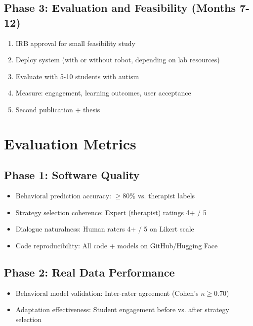 \documentclass[12pt, a4paper]{article}
\begin{document}
\subsection{Phase 3: Evaluation and Feasibility (Months 7-12)}

\begin{enumerate}
    \item IRB approval for small feasibility study
    \item Deploy system (with or without robot, depending on lab resources)
    \item Evaluate with 5-10 students with autism
    \item Measure: engagement, learning outcomes, user acceptance
    \item Second publication + thesis
\end{enumerate}

\section{Evaluation Metrics}

\subsection{Phase 1: Software Quality}

\begin{itemize}
    \item Behavioral prediction accuracy: $\geq 80\%$ vs. therapist labels
    \item Strategy selection coherence: Expert (therapist) ratings 4+ / 5
    \item Dialogue naturalness: Human raters 4+ / 5 on Likert scale
    \item Code reproducibility: All code + models on GitHub/Hugging Face
\end{itemize}

\subsection{Phase 2: Real Data Performance}

\begin{itemize}
    \item Behavioral model validation: Inter-rater agreement (Cohen's $\kappa \geq 0.70$)
    \item Adaptation effectiveness: Student engagement before vs. after strategy selection
\end{itemize}
\end{document}
